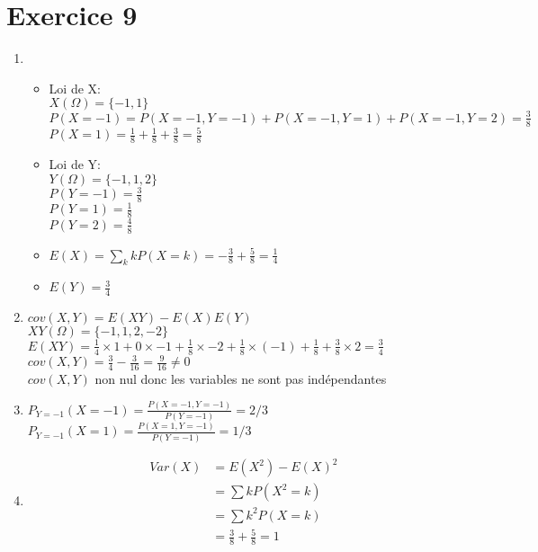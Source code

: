 \documentclass[12pt]{report}
\begin{document}
\section{Exercice 9}
\begin{enumerate}
    \item 
    \begin{itemize}
        \item Loi de X:\\
        $X(\Omega) = \{ -1,1 \}$\\
        $P(X=-1) = P(X=-1, Y = -1) + P(X=-1, Y = 1)+ P(X=-1, Y=2) = \frac{3}{8}$\\
        $P(X=1) = \frac{1}{8}+ \frac{1}{8} +\frac{3}{8} = \frac{5}{8}$\\
        \item Loi de Y:\\
        $Y(\Omega) = \{ -1,1,2 \}$\\
        $P(Y = -1) = \frac{3}{8}$\\
        $P(Y = 1) = \frac{1}{8}$\\
        $P(Y = 2) = \frac{4}{8}$\\
        \item $E(X) = \sum_k k P(X=k) = -\frac{3}{8} + \frac{5}{8} = \frac{1}{4}$
        \item $E(Y) = \frac{3}{4}$
    \end{itemize}
    \item $cov(X,Y) = E(XY) - E(X)E(Y)$\\
    $XY(\Omega) = \{ -1,1,2,-2 \}$
    $E(XY) = \frac{1}{4} \times 1 + 0 \times -1 + \frac{1}{8} \times -2 + \frac{1}{8} \times (-1) + \frac{1}{8} + \frac{3}{8} \times 2 = \frac{3}{4}$\\
    $cov(X,Y) = \frac{3}{4} - \frac{3}{16} = \frac{9}{16} \neq 0$\\
    $cov(X,Y)$ non nul donc les variables ne sont pas indépendantes
    \item $P_{Y=-1}(X = -1) = \frac{P(X=-1,Y=-1)}{P(Y=-1)} = 2/3$\\    
    $P_{Y=-1}(X = 1) = \frac{P(X=1,Y=-1)}{P(Y=-1)} = 1/3$\\  
    \item \begin{align*}
        Var(X) &= E(X^2) - E(X)^2\\
        &= \sum k P(X^2=k)\\
        &= \sum k^2 P(X = k)\\
        &= \frac{3}{8} + \frac{5}{8} =1
    \end{align*}
\end{enumerate}
\end{document}
